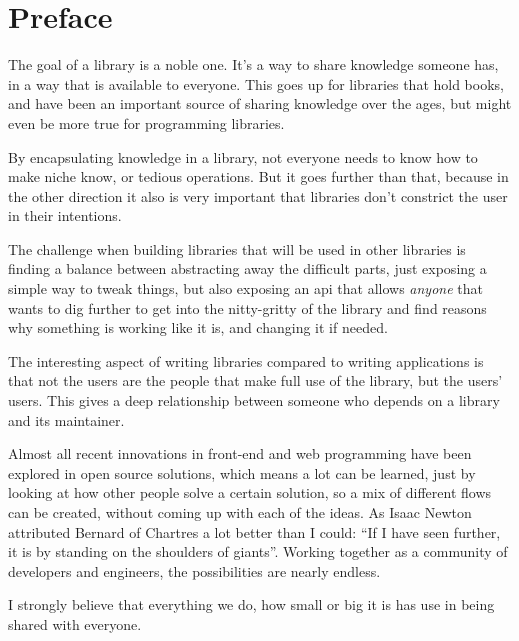 
\chapter{Preface}%
\label{chp:preface}

The goal of a \gls{library} is a noble one. It's a way to share knowledge someone has, in a way that is available to everyone. This goes up for libraries that hold books, and have been an important source of sharing knowledge over the ages, but might even be more true for programming libraries. 

By encapsulating knowledge in a \gls{library}, not everyone needs to know how to make niche know, or tedious operations. But it goes further than that, because in the other direction it also is very important that libraries don't constrict the user in their intentions.

The challenge when building libraries that will be used in other libraries is finding a balance between abstracting away the difficult parts, just exposing a simple way to tweak things, but also exposing an \acrshort{api} that allows \emph{anyone} that wants to dig further to get into the nitty-gritty of the \gls{library} and find reasons why something is working like it is, and changing it if needed.

The interesting aspect of writing libraries compared to writing applications is that not the users are the people that make full use of the \gls{library}, but the users' users. This gives a deep relationship between someone who depends on a \gls{library} and its maintainer.

Almost all recent innovations in front-end and web programming have been explored in open source solutions, which means a lot can be learned, just by looking at how other people solve a certain solution, so a mix of different flows can be created, without coming up with each of the ideas. As Isaac Newton\cite{newton-giants} attributed Bernard of Chartres\cite{quote-giants-source} a lot better than I could: ``If I have seen further, it is by standing on the shoulders of giants''. Working together as a community of developers and engineers, the possibilities are nearly endless.

I strongly believe that everything we do, how small or big it is has use in being shared with everyone.
